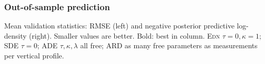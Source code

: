 \documentclass[aspectratio=169,t,xcolor=table]{beamer}
\begin{document}
\begin{frame}
  \frametitle{Out-of-sample prediction}
  \begin{table}
    \caption{Mean validation statistics
      $\bar{v}^{(p, q)}$: RMSE (left) and negPPLD (right).
      Smaller values are better. Bold: best in class.}%
    \label{tab:validation-statistics-mini}
  \end{table}

  Mean validation statistics: RMSE (left) and negative posterior
predictive log-density (right).  Smaller values are better. Bold: best
in column. \textsc{Edn} $\tau = 0, \kappa = 1$; \textsc{SDE} $\tau =
0$; \textsc{ADE} $\tau, \kappa, \lambda$ all free; \textsc{ARD} as
many free parameters as measurements per vertical profile.
\end{frame}
\end{document}
